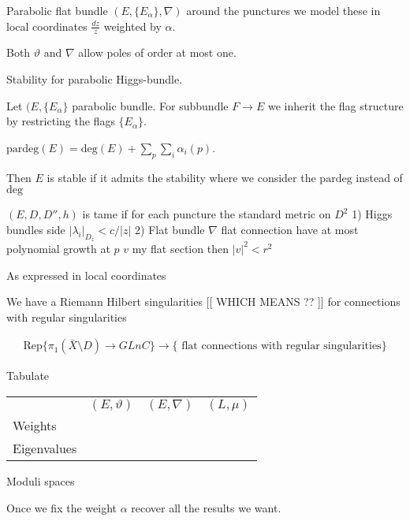 Parabolic flat bundle $(E, \{ E_\alpha \}, \nabla ) $ 
around the punctures we model these in local coordinates $ \frac{dz}{z} $ weighted by $\alpha$. 

Both $ \vartheta $ and $\nabla $ allow poles of order at most one. 

Stability for parabolic Higgs-bundle. 

\begin{definition}
    Let $ ( E, \{ E_\alpha \} $ parabolic bundle. 
    For subbundle $F \rightarrow  E $ we inherit the flag structure by restricting the flags $\{E_\alpha\} $.

    $\mathrm{pardeg}(E) = \mathrm{deg}(E) + \sum_p \sum_i \alpha_i(p) $. 

    Then $E$ is stable if it admits the stability where we consider the $\mathrm{pardeg} $ instead of $\mathrm{deg}$ 
\end{definition}

\begin{definition}
    $(E, D, D'', h) $ is tame  if 
    for each puncture  the standard metric on $D^2$ 
    1) Higgs bundles side $ | \lambda_i | _{D_z} < c / |z| $ 
    2) Flat bundle $ \nabla $ flat connection have at most polynomial growth at $p $
    $v$ my flat section then $ |v|^2 < r ^2 $ 

    As expressed in local coordinates
\end{definition}

We have a Riemann Hilbert singularities  [[ WHICH MEANS ?? ]] 
for connections with regular singularities 

\begin{align}
    \mathrm{Rep} \{ \pi_1 ( \bar{X} \setminus D ) \rightarrow GLnC \} \rightarrow \{ \mbox{ flat connections with regular singularities} \} 
\end{align}

Tabulate 
\begin{tabularx}{0.8\linewidth}{X|XXX}
 & $( E,\vartheta) $& $ (E, \nabla ) $ & $ (L, \mu) $ \\ 

Weights  \\ 

Eigenvalues \\ 


\end{tabularx} 



Moduli spaces

Once we fix the weight $\alpha$
recover all the results we want. 

